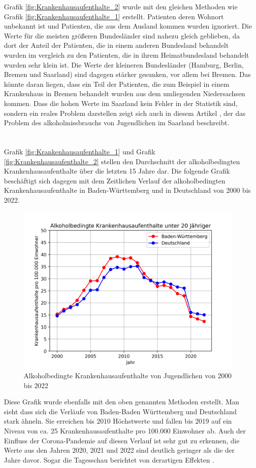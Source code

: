 \documentclass[12pt]{article}
\begin{document}
Grafik \ref{fig:Krankenhausaufenthalte_2} wurde mit den gleichen Methoden wie Grafik \ref{fig:Krankenhausaufenthalte_1} erstellt. Patienten deren Wohnort unbekannt ist und Patienten, die aus dem Ausland kommen wurden ignoriert. 
Die Werte für die meisten größeren Bundesländer sind nahezu gleich geblieben, da dort der Anteil der Patienten, die in einem anderen Bundesland behandelt wurden im vergleich zu den Patienten, die in ihrem Heimatbundesland behandelt wurden sehr klein ist. Die Werte der kleineren Bundesländer (Hamburg, Berlin, Bremen und Saarland) sind dagegen stärker gesunken, vor allem bei Bremen. Das könnte daran liegen, dass ein Teil der Patienten, die zum Beispiel in einem Krankenhaus in Bremen behandelt wurden aus dem umliegenden Niedersachsen kommen. Dass die hohen Werte im Saarland kein Fehler in der Statistik sind, sondern ein reales Problem darstellen zeigt sich auch in diesem Artikel \autocite{noauthor_saarland_nodate}, der das Problem des alkoholmissbrauchs von Jugendlichen im Saarland beschreibt. 
\\\\\\
Grafik \ref{fig:Krankenhausaufenthalte_1} und Grafik \ref{fig:Krankenhausaufenthalte_2} stellen den Durchschnitt der alkoholbedingten Krankenhausaufenthalte über die letzten 15 Jahre dar. Die folgende Grafik beschäftigt sich dagegen mit dem Zeitlichen Verlauf der alkoholbedingten Krankenhausaufenthalte in Baden-Württemberg und in Deutschland von 2000 bis 2022.
\begin{figure}[H]
    \centering
    \includegraphics[scale=.7]{"assets/Alkohol_BW_Ges.png"}
    \caption{Alkoholbedingte Krankenhausaufenthalte von Jugendlichen von 2000 bis 2022}
    \label{fig:Krankenhausaufenthalte_3}
\end{figure}
Diese Grafik wurde ebenfalls mit den oben genannten Methoden erstellt.
Man sieht dass sich die Verläufe von Baden-Baden Württemberg und Deutschland stark ähneln. Sie erreichen bis 2010 Höchstwerte und fallen bis 2019 auf ein Niveau von ca. 25 Krankenhausaufenthalte pro 100.000 Einwohner ab. Auch der Einfluss der Corona-Pandemie auf diesen Verlauf ist sehr gut zu erkennen, die Werte aus den Jahren 2020, 2021 und 2022 sind deutlich geringer als die der Jahre davor. Sogar die Tagesschau berichtet von derartigen Effekten \autocite{tagesschaude_weniger_nodate}.
\end{document}
